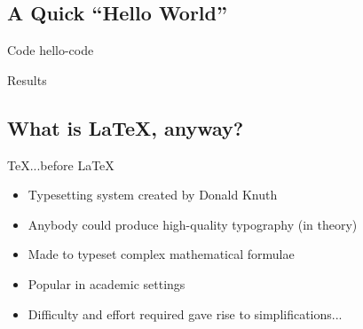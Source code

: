 \documentclass{beamer}
\begin{document}
\subsection{A Quick ``Hello World''}
\begin{frame}{Code}
  {hello-code}
\end{frame}
\begin{frame}{Results}
\end{frame}

\subsection{What is \LaTeX, anyway?}
\begin{frame}{\TeX}{...before \LaTeX}
  \begin{itemize}
    \item
      Typesetting system created by Donald Knuth
    \item
      Anybody could produce high-quality typography (in theory)
    \item
      Made to typeset complex mathematical formulae
    \item
      Popular in academic settings
    \item
      Difficulty and effort required gave rise to simplifications...
  \end{itemize}
\end{frame}
\end{document}
